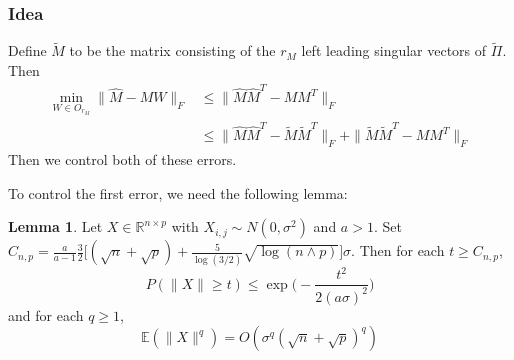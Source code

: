 \documentclass[notheorems]{beamer}
\theoremstyle{definition}
\newtheorem{lem}[definition]{Lemma}
\begin{document}
\begin{frame}
\frametitle{Idea}
Define $\tilde{M}$ to be the matrix consisting of the $r_M$ left leading singular vectors of $\tilde{\Pi}$. Then 
\begin{align*}
    \min_{W \in O_{r_M}} \|\hat{M} - MW\|_F 
    & \leq \|\hat{M}\hat{M}^T - MM^T\|_F \\
    & \leq \|\hat{M}\hat{M}^T - \tilde{M}\tilde{M}^T\|_F + \|\tilde{M}\tilde{M}^T - MM^T\|_F
\end{align*}
Then we control both of these errors.
\end{frame}










\begin{frame}
To control the first error, we need the following lemma:
\begin{lem}
Let $X \in \mathbb{R}^{n \times p}$ with $X_{i,j} \sim N(0, \sigma^2)$ and $a > 1$. Set $C_{n,p} = \frac{a}{a-1}\frac{3}{2}\bigg[(\sqrt{n} + \sqrt{p}) + \frac{5}{\log{(3/2)}} \sqrt{\log{(n \wedge p)}} \bigg]\sigma$. Then for each $t \geq  C_{n,p}$, 
\begin{equation*}
    P(\|X\| \geq t) \leq \exp \bigg(-\frac{t^2}{2(a \sigma)^2} \bigg)
\end{equation*}
and for each $q \geq 1$,
\begin{equation*}
    \mathbb{E}(\|X\|^q) = O(\sigma^q(\sqrt{n} + \sqrt{p})^q)
\end{equation*}
\end{lem} 
\end{frame}
\end{document}
